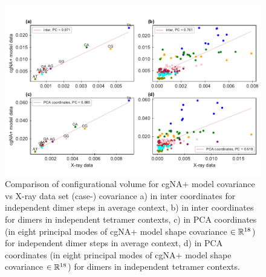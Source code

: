 \begin{figure}[H]
	\begin{center}
	\includegraphics[scale=0.9]{./Xray_images/vol_R2_DX2_3S_C1_cg.pdf}
	\caption{Comparison of configurational volume
	for cgNA$+$ model covariance vs X-ray data set (case-) covariance a) in inter coordinates for independent dimer steps in average context, b) in inter coordinates for dimers in independent tetramer contexts, c) in PCA coordinates (in  eight principal modes of cgNA$+$ model shape covariance $\in {\mathbb R}^{18}$) for independent dimer steps in average context, d) in PCA coordinates (in  eight principal modes of cgNA$+$ model shape covariance $\in {\mathbb R}^{18}$) for dimers in independent tetramer contexts.}
\label{SIfig:TX3stiff}
\end{center}
\end{figure}

